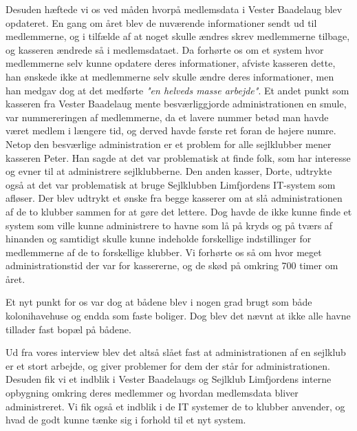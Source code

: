 Desuden hæftede vi os ved måden hvorpå medlemsdata i Vester Baadelaug blev opdateret. En gang om året blev de nuværende informationer sendt ud til medlemmerne, og i tilfælde af at noget skulle ændres skrev medlemmerne tilbage, og kasseren ændrede så i medlemsdataet. Da forhørte os om et system hvor medlemmerne selv kunne opdatere deres informationer, afviste kasseren dette, han ønskede ikke at medlemmerne selv skulle ændre deres informationer, men han medgav dog at det medførte \textit{"en helveds masse arbejde"}. Et andet punkt som kasseren fra Vester Baadelaug mente besværliggjorde administrationen en smule, var nummereringen af medlemmerne, da et lavere nummer betød man havde været medlem i længere tid, og derved havde første ret foran de højere numre. Netop den besværlige administration er et problem for alle sejlklubber mener kasseren Peter. Han sagde at det var problematisk at finde folk, som har interesse og evner til at administrere sejlklubberne. Den anden kasser, Dorte, udtrykte også at det var problematisk at bruge Sejlklubben Limfjordens IT-system som afløser. Der blev udtrykt et ønske fra begge kasserer om at slå administrationen af de to klubber sammen for at gøre det lettere. Dog havde de ikke kunne finde et system som ville kunne administrere to havne som lå på kryds og på tværs af hinanden og samtidigt skulle kunne indeholde forskellige indstillinger for medlemmerne af de to forskellige klubber. Vi forhørte os så om hvor meget administrationstid der var for kassererne, og de skød på omkring 700 timer om året.

Et nyt punkt for os var dog at bådene blev i nogen grad brugt som både kolonihavehuse og endda som faste boliger. Dog blev det nævnt at ikke alle havne tillader fast bopæl på bådene. 
 
Ud fra vores interview blev det altså slået fast at administrationen af en sejlklub er et stort arbejde, og giver problemer for dem der står for administrationen. Desuden fik vi et indblik i Vester Baadelaugs og Sejlklub Limfjordens interne opbygning omkring deres medlemmer og hvordan medlemsdata bliver administreret. Vi fik også et indblik i de IT systemer de to klubber anvender, og hvad de godt kunne tænke sig i forhold til et nyt system.
